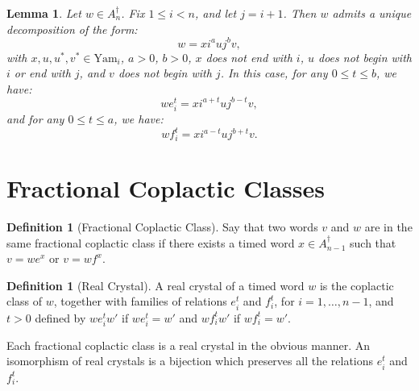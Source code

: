\documentclass[12pt]{amsproc}
\newcommand{\Yam}{\mathrm{Yam}}
\newtheorem{lemma}[theorem]{Lemma}
\theoremstyle{definition}
\newtheorem{definition}[theorem]{Definition}
\begin{document}
\begin{lemma}
  Let $w\in A_n^\dagger$.
  Fix $1\leq i < n$, and let $j=i+1$.
  Then $w$ admits a unique decomposition of the form:
  \begin{displaymath}
    w = xi^auj^bv,
  \end{displaymath}
  with $x,u,u^*,v^*\in \Yam_i$, $a>0$, $b>0$, $x$ does not end with $i$, $u$ does not begin with $i$ or end with $j$, and $v$ does not begin with $j$.
  In this case, for any $0\leq t\leq b$, we have:
  \begin{displaymath}
    we_i^t = xi^{a+t}uj^{b-t}v,
  \end{displaymath}
  and for any $0\leq t\leq a$, we have:
  \begin{displaymath}
    wf_i^t = xi^{a-t}uj^{b+t}v.
  \end{displaymath}
\end{lemma}
\section{Fractional Coplactic Classes}
\label{sec:fract-copl-class}
\begin{definition}[Fractional Coplactic Class]
  Say that two words $v$ and $w$ are in the same fractional coplactic class if there exists a timed word $x\in A_{n-1}^\dagger$ such that $v=we^x$ or $v=wf^x$.
\end{definition}
\begin{definition}[Real Crystal]
  A real crystal of a timed word $w$ is the coplactic class of $w$, together with families of relations $e_i^t$ and $f_i^t$, for $i=1,\dotsc,n-1$, and $t>0$ defined by $we_i^t w'$ if $we_i^t = w'$ and $wf_i^tw'$ if $wf_i^t=w'$.
\end{definition}
Each fractional coplactic class is a real crystal in the obvious manner.
An isomorphism of real crystals is a bijection which preserves all the relations $e_i^t$ and $f_i^t$.
\end{document}

